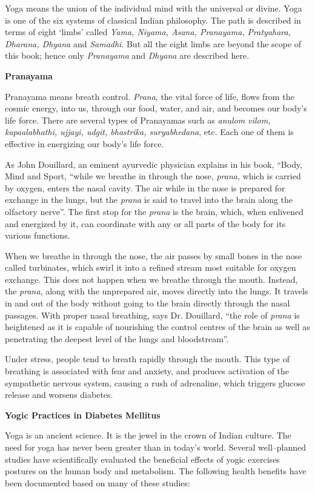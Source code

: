 Yoga means the union of the individual mind with the universal or divine. Yoga is one of the six systems of classical Indian philosophy. The path is described in terms of eight ‘limbs’ called \textit{Yama, Niyama, Asana, Pranayama, Pratyahara, Dharana, Dhyana} and \textit{Samadhi}. But all the eight limbs are beyond the scope of this book; hence only \textit{Pranayama} and \textit{Dhyana} are described here.

\textbf{Pranayama}

Pranayama means breath control. \textit{Prana}, the vital force of life, flows from the cosmic energy, into us, through our food, water, and air, and becomes our body’s life force. There are several types of Pranayamas such as \textit{anulom vilom, kapaalabhathi, ujjayi, udgit, bhastrika, suryabhedana}, etc. Each one of them is effective in energizing our body’s life force.

As John Douillard, an eminent ayurvedic physician explains in his book, “Body, Mind and Sport, “while we breathe in through the nose, \textit{prana}, which is carried by oxygen, enters the nasal cavity. The air while in the nose is prepared for exchange in the lungs, but the \textit{prana} is said to travel into the brain along the olfactory nerve”. The first stop for the \textit{prana} is the brain, which, when enlivened and energized by it, can coordinate with any or all parts of the body for its various functions.

When we breathe in through the nose, the air passes by small bones in the nose called turbinates, which swirl it into a refined stream most suitable for oxygen exchange. This does not happen when we breathe through the mouth. Instead, the \textit{prana}, along with the unprepared air, moves directly into the lungs. It travels in and out of the body without going to the brain directly through the nasal passages. With proper nasal breathing, says Dr. Douillard, “the role of \textit{prana} is heightened as it is capable of nourishing the control centres of the brain as well as penetrating the deepest level of the lungs and bloodstream”.

Under stress, people tend to breath rapidly through the mouth. This type of breathing is associated with fear and anxiety, and produces activation of the sympathetic nervous system, causing a rush of adrenaline, which triggers glucose release and worsens diabetes.

\textbf{Yogic Practices in Diabetes Mellitus}

Yoga is an ancient science. It is the jewel in the crown of Indian culture. The need for yoga has never been greater than in today’s world. Several well–planned studies have scientifically evaluated the beneficial effects of yogic exercises postures on the human body and metabolism. The following health benefits have been documented based on many of these studies:

